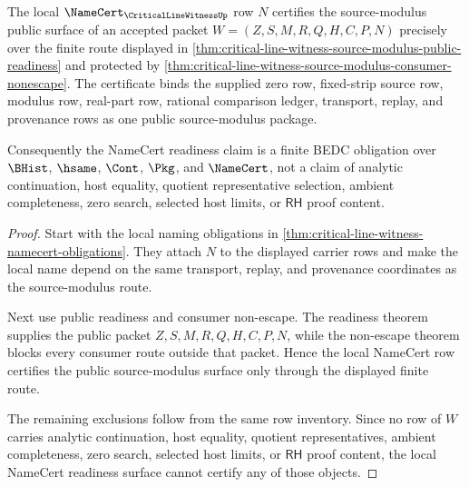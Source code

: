 \begin{theorem}
\label{thm:critical-line-witness-source-modulus-namecert-readiness}
The local $\NameCert_{\CriticalLineWitnessUp}$ row $N$ certifies the source-modulus public surface of an accepted packet $W=(Z,S,M,R,Q,H,C,P,N)$ precisely over the finite route displayed in \autoref{thm:critical-line-witness-source-modulus-public-readiness} and protected by \autoref{thm:critical-line-witness-source-modulus-consumer-nonescape}. The certificate binds the supplied zero row, fixed-strip source row, modulus row, real-part row, rational comparison ledger, transport, replay, and provenance rows as one public source-modulus package.

Consequently the NameCert readiness claim is a finite BEDC obligation over $\BHist$, $\hsame$, $\Cont$, $\Pkg$, and $\NameCert$, not a claim of analytic continuation, host equality, quotient representative selection, ambient completeness, zero search, selected host limits, or $\mathsf{RH}$ proof content.
\end{theorem}
\begin{proof}
Start with the local naming obligations in \autoref{thm:critical-line-witness-namecert-obligations}. They attach $N$ to the displayed carrier rows and make the local name depend on the same transport, replay, and provenance coordinates as the source-modulus route.

Next use public readiness and consumer non-escape. The readiness theorem supplies the public packet $Z,S,M,R,Q,H,C,P,N$, while the non-escape theorem blocks every consumer route outside that packet. Hence the local NameCert row certifies the public source-modulus surface only through the displayed finite route.

The remaining exclusions follow from the same row inventory. Since no row of $W$ carries analytic continuation, host equality, quotient representatives, ambient completeness, zero search, selected host limits, or $\mathsf{RH}$ proof content, the local NameCert readiness surface cannot certify any of those objects.
\end{proof}
